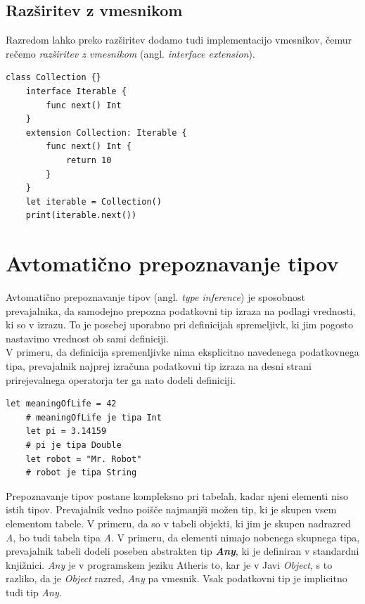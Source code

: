 \documentclass[a4paper, 12p]{book}
\begin{document}
\newpage
\subsection{Razširitev z vmesnikom}

Razredom lahko preko razširitev dodamo tudi implementacijo vmesnikov, čemur rečemo \textit{razširitev z vmesnikom} (angl. \textit{interface extension}).

\begin{lstlisting}[caption=Razširitev z vmesnikom., captionpos=b]
	class Collection {}
	interface Iterable {
	    func next() Int
	}
	extension Collection: Iterable {
	    func next() Int {
	        return 10
	    }
	}
	let iterable = Collection()
	print(iterable.next())
\end{lstlisting}

\section{Avtomatično prepoznavanje tipov}

Avtomatično prepoznavanje tipov (angl. \textit{type inference}) je sposobnost prevajalnika, da samodejno prepozna podatkovni tip izraza na podlagi vrednosti, ki so v izrazu. To je posebej uporabno pri definicijah spremeljivk, ki jim pogosto nastavimo vrednost ob sami definiciji. \\
\indent V primeru, da definicija spremenljivke nima eksplicitno navedenega podatkovnega tipa, prevajalnik najprej izračuna podatkovni tip izraza na desni strani prirejevalnega operatorja ter ga nato dodeli definiciji.

\begin{lstlisting}[caption={Avtomatično prepoznavanje podatkovnih tipov.}, captionpos=b]
	let meaningOfLife = 42
	# meaningOfLife je tipa Int
	let pi = 3.14159
	# pi je tipa Double
	let robot = "Mr. Robot"
	# robot je tipa String
\end{lstlisting}

Prepoznavanje tipov postane kompleksno pri tabelah, kadar njeni elementi niso istih tipov. Prevajalnik vedno poišče najmanjši možen tip, ki je skupen vsem elementom tabele. V primeru, da so v tabeli objekti, ki jim je skupen nadrazred \textit{A}, bo tudi tabela tipa \textit{A}. V primeru, da elementi nimajo nobenega skupnega tipa, prevajalnik tabeli dodeli poseben abstrakten tip \textit{\textbf{Any}}, ki je definiran v standardni knjižnici. \textit{Any} je v programskem jeziku Atheris to, kar je v Javi \textit{Object}, s to razliko, da je \textit{Object} razred, \textit{Any} pa vmesnik. Vsak podatkovni tip je implicitno tudi tip \textit{Any}.
\end{document}
